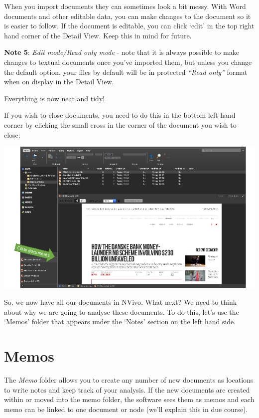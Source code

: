 \documentclass[
]{book}
\begin{document}
When you import documents they can sometimes look a bit messy. With Word documents and other editable data, you can make changes to the document so it is easier to follow. If the document is editable, you can click `edit' in the top right hand corner of the Detail View. Keep this in mind for future.

\textbf{Note 5}: \emph{Edit mode/Read only mode} - note that it is always possible to make changes to textual documents once you've imported them, but unless you change the default option, your files by default will be in protected \emph{``Read only''} format when on display in the Detail View.

Everything is now neat and tidy!

If you wish to close documents, you need to do this in the bottom left hand corner by clicking the small cross in the corner of the document you wish to close:

\includegraphics{imgs/neat_tidy.png}

So, we now have all our documents in NVivo. What next? We need to think about why we are going to analyse these documents. To do this, let's use the `Memos' folder that appears under the `Notes' section on the left hand side.

\hypertarget{memos}{%
\section{Memos}\label{memos}}

The \emph{Memo} folder allows you to create any number of new documents as locations to write notes and keep track of your analysis. If the new documents are created within or moved into the memo folder, the software sees them as memos and each memo can be linked to one document or node (we'll explain this in due course).
\end{document}
